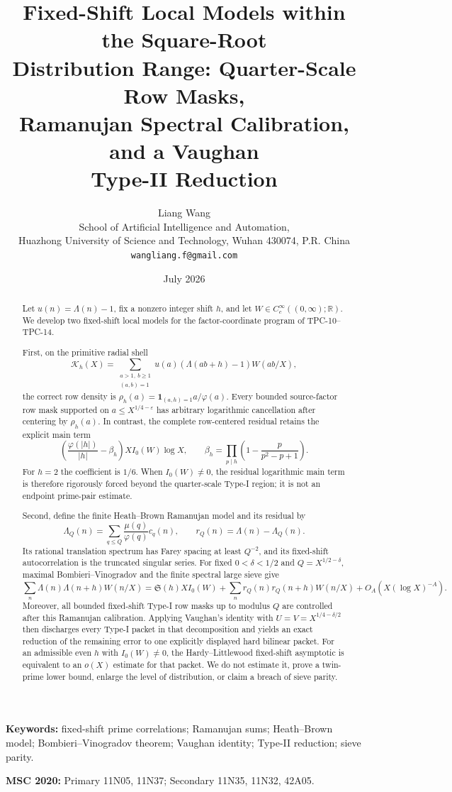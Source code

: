 \documentclass[11pt]{article}
\title{\textbf{Fixed-Shift Local Models within the Square-Root}\\
\textbf{Distribution Range: Quarter-Scale Row Masks,}\\
\textbf{Ramanujan Spectral Calibration, and a Vaughan}\\
\textbf{Type-II Reduction}}
\author{Liang Wang\\
\small School of Artificial Intelligence and Automation,\\[-0.2em]
\small Huazhong University of Science and Technology, Wuhan 430074, P.R. China\\
\small \texttt{wangliang.f@gmail.com}}
\date{July 2026}
\theoremstyle{definition}
\theoremstyle{remark}
\newcommand{\R}{\mathbb R}
\newcommand{\one}{\mathbf 1}
\newcommand{\eps}{\varepsilon}
\newcommand{\cK}{\mathcal K}
\begin{document}
\maketitle

\begin{abstract}
Let $u(n)=\Lambda(n)-1$, fix a nonzero integer shift $h$, and let
$W\in C_c^\infty((0,\infty);\R)$.  We develop two fixed-shift local
models for the factor-coordinate program of TPC-10--TPC-14.

First, on the primitive radial shell
\[
 \cK_h(X)=\sum_{\substack{a>1,\ b\geq1\\(a,b)=1}}
 u(a)(\Lambda(ab+h)-1)W(ab/X),
\]
the correct row density is
$\rho_h(a)=\one_{(a,h)=1}a/\varphi(a)$.  Every bounded source-factor row
mask supported on $a\leq X^{1/4-\eps}$ has arbitrary logarithmic
cancellation after centering by $\rho_h(a)$.  In contrast, the complete
row-centered residual retains the explicit main term
\[
 \left(\frac{\varphi(|h|)}{|h|}-\beta_h\right)
 XI_0(W)\log X,
 \qquad
 \beta_h=\prod_{p\mid h}\left(1-\frac{p}{p^2-p+1}\right).
\]
For $h=2$ the coefficient is $1/6$.  When $I_0(W)\ne0$, the residual
logarithmic main term is therefore rigorously forced beyond the
quarter-scale Type-I region; it is not an endpoint prime-pair estimate.

Second, define the finite Heath--Brown Ramanujan model and its residual by
\[
 \Lambda_Q(n)=\sum_{q\leq Q}\frac{\mu(q)}{\varphi(q)}c_q(n),
 \qquad r_Q(n)=\Lambda(n)-\Lambda_Q(n).
\]
Its rational translation spectrum has Farey spacing at least $Q^{-2}$,
and its fixed-shift autocorrelation is the truncated singular series.
For fixed $0<\delta<1/2$ and $Q=X^{1/2-\delta}$, maximal
Bombieri--Vinogradov and the finite
spectral large sieve give
\[
 \sum_n\Lambda(n)\Lambda(n+h)W(n/X)
 =\mathfrak S(h)XI_0(W)+
 \sum_nr_Q(n)r_Q(n+h)W(n/X)
 +O_A(X(\log X)^{-A}).
\]
Moreover, all bounded fixed-shift Type-I row masks up to modulus $Q$ are
controlled after this Ramanujan calibration.  Applying Vaughan's identity
with $U=V=X^{1/4-\delta/2}$ then discharges every Type-I packet in that
decomposition and yields an
exact reduction of the remaining error to one explicitly displayed hard
bilinear packet.  For an admissible even $h$ with $I_0(W)\ne0$, the
Hardy--Littlewood fixed-shift asymptotic is equivalent to an $o(X)$ estimate
for that packet.  We do not estimate it, prove a
twin-prime lower bound, enlarge the level of distribution, or claim a
breach of sieve parity.
\end{abstract}

\noindent\textbf{Keywords:} fixed-shift prime correlations; Ramanujan
sums; Heath--Brown model; Bombieri--Vinogradov theorem; Vaughan identity;
Type-II reduction; sieve parity.

\medskip
\noindent\textbf{MSC 2020:} Primary 11N05, 11N37; Secondary
11N35, 11N32, 42A05.













\end{document}
